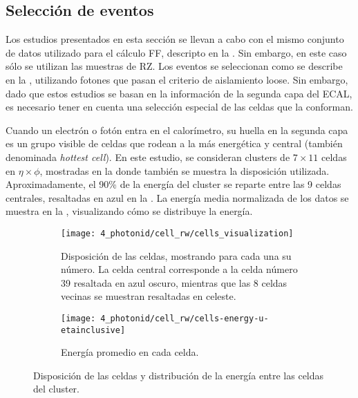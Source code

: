 \subsection{Selecci\'on de eventos}
\label{subsec:ss_corrections:cell_rw:event_selection}

Los estudios presentados en esta sección se llevan a cabo con el mismo conjunto de datos utilizado para el cálculo \ac{FF}, descripto en la \Sect{\ref{subsec:ss_corrections:ffs:samples}}. Sin embargo, en este caso sólo se utilizan las muestras de \ac{RZ}.
Los eventos se seleccionan como se describe en la \Sect{\ref{subsec:pid_ss:pid:event_selection}}, utilizando fotones que pasan el criterio de aislamiento loose. Sin embargo, dado que estos estudios se basan en la información de la segunda capa del \ac{ECAL}, es necesario tener en cuenta una selección especial de las celdas que la conforman.

Cuando un electrón o fotón entra en el calorímetro, su huella en la segunda capa es un grupo visible de celdas que rodean a la más energética y central (también denominada \textit{hottest cell}). En este estudio, se consideran clusters de \(7\times 11\) celdas en \(\eta\times\phi\), mostradas en la \Fig{\ref{fig:ss_corrections:cell_rw:event_selection:cluster:arrangement}} donde tambi\'en se muestra la disposición utilizada.
Aproximadamente, el 90\% de la energía del cluster se reparte entre las 9 celdas centrales, resaltadas en azul en la \Fig{\ref{fig:ss_corrections:cell_rw:event_selection:cluster:arrangement}}. La energía media normalizada de los datos se muestra en la \Fig{\ref{fig:ss_corrections:cell_rw:event_selection:cluster:energy}}, visualizando cómo se distribuye la energía.

\begin{figure}[ht!]
    \centering
    \begin{subfigure}[t]{0.49\linewidth}
        \centering
        \texttt{[image: 4\_photonid/cell\_rw/cells\_visualization]}
        \caption{Disposici\'on de las celdas, mostrando para cada una su n\'umero. La celda central corresponde a la celda n\'umero 39 resaltada en azul oscuro, mientras que las 8 celdas vecinas se muestran resaltadas en celeste.}
        \label{fig:ss_corrections:cell_rw:event_selection:cluster:arrangement}
    \end{subfigure}
    \hfill
    \begin{subfigure}[t]{0.49\linewidth}
        \centering
        \texttt{[image: 4\_photonid/cell\_rw/cells-energy-u-etainclusive]}
        \caption{Energ\'ia promedio en cada celda.}
        \label{fig:ss_corrections:cell_rw:event_selection:cluster:energy}
    \end{subfigure}
    \caption{Disposici\'on de las celdas y distribuci\'on de la energ\'ia entre las celdas del cluster.}
    \label{fig:ss_corrections:cell_rw:event_selection:cluster}
\end{figure}

